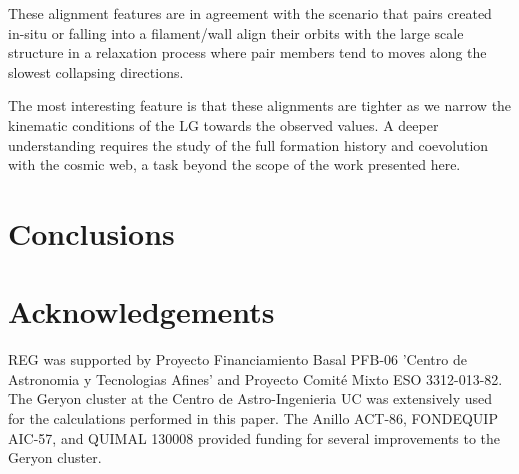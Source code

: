 \documentclass{emulateapj}
\begin{document}
These alignment features are in agreement with the scenario that pairs 
created in-situ or falling into a filament/wall align their orbits with 
the large scale structure in a relaxation process where pair members
tend to moves along the slowest collapsing directions.

The most interesting feature is that these alignments are
tighter as we narrow the kinematic conditions of the LG towards the
observed values. A deeper understanding requires the study of the full
formation history and coevolution with the cosmic web, a task beyond
the scope of the work presented here.


\section{Conclusions}
\label{sec:conclusions}


\section*{Acknowledgements}
REG was supported by Proyecto Financiamiento Basal PFB-06 'Centro de Astronomia y Tecnologias Afines' and Proyecto Comit\'e Mixto ESO 3312-013-82.
The Geryon cluster at the Centro de Astro-Ingenieria UC was extensively used for the calculations performed in this paper. The Anillo ACT-86, FONDEQUIP AIC-57, and QUIMAL 130008 provided funding for several improvements to the Geryon cluster.


 
\end{document}
